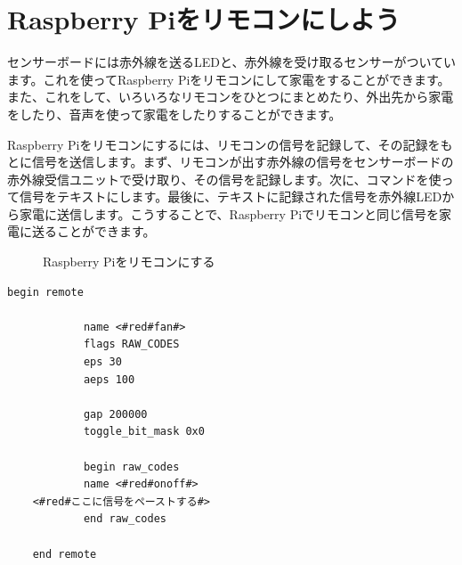 \documentclass[text05.tex]{subfiles}
\begin{document}
\newpage
\section{Raspberry Piをリモコンにしよう}
センサーボードには赤外線を送るLEDと、赤外線を受け取るセンサーがついています。これを使ってRaspberry Piをリモコンにして家電をすることができます。また、これをして、いろいろなリモコンをひとつにまとめたり、外出先から家電をしたり、音声を使って家電をしたりすることができます。

Raspberry Piをリモコンにするには、リモコンの信号を記録して、その記録をもとに信号を送信します。まず、リモコンが出す赤外線の信号をセンサーボードの赤外線受信ユニットで受け取り、その信号を記録します。次に、コマンドを使って信号をテキストにします。最後に、テキストに記録された信号を赤外線LEDから家電に送信します。こうすることで、Raspberry Piでリモコンと同じ信号を家電に送ることができます。
\begin{figure}[H]
    \centering
 
    \caption{Raspberry Piをリモコンにする}
\end{figure}
\begin{lstlisting}[caption=template.lircd.conf,label=template.lircd.conf]
    begin remote
    
            name <#red#fan#>
            flags RAW_CODES
            eps 30
            aeps 100
    
            gap 200000
            toggle_bit_mask 0x0
    
            begin raw_codes
            name <#red#onoff#>
    <#red#ここに信号をペーストする#>
            end raw_codes
    
    end remote
    \end{lstlisting}

\newpage
\end{document}
